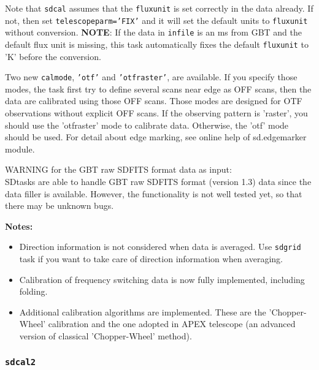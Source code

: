 Note that {\tt sdcal} assumes that the {\tt fluxunit} is set correctly in
the data already.  If not, then set {\tt telescopeparm='FIX'} and it
will set the default units to {\tt fluxunit} without conversion.
{\bf NOTE}: If the data in {\tt infile} is an ms from GBT and the default flux
unit is missing, this task automatically fixes the default {\tt fluxunit}
to 'K' before the conversion.

Two new {\tt calmode}, {\tt 'otf'} and {\tt 'otfraster'}, are available. If you 
specify those modes, the task first try to define several scans 
near edge as OFF scans, then the data are calibrated using those 
OFF scans. Those modes are designed for OTF observations without 
explicit OFF scans. If the observing pattern is 'raster', you 
should use the 'otfraster' mode to calibrate data. Otherwise, the 
'otf' mode should be used. For detail about edge marking, see 
online help of sd.edgemarker module.

WARNING for the GBT raw SDFITS format data as input:\\
SDtasks are able to handle GBT raw SDFITS format (version 1.3) data since the 
data filler is available. However, the functionality is not well 
tested yet, so that there may be unknown bugs. 

{\bf Notes:}
 \begin{itemize}
  \item Direction information is not considered when data is averaged. 
Use {\tt sdgrid} task if you want to take care of direction information 
when averaging.
  \item Calibration of frequency switching data is now fully implemented, including folding.
  \item Additional calibration algorithms are implemented. These are the
'Chopper-Wheel' calibration and the one adopted in APEX telescope (an advanced version of classical 'Chopper-Wheel' method). 
\end{itemize}

\subsubsection{{\tt sdcal2}}
\label{section:sd.sdtasks.tasks.sdcal2}

